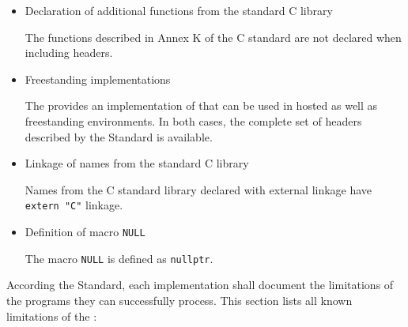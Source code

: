 \begin{itemize}

\item Declaration of additional functions from the standard C library 

The functions described in Annex K of the C standard are not declared when including \cpp{} headers.

\item Freestanding implementations 

The \ecs{} provides an implementation of \cpp{} that can be used in hosted as well as freestanding environments.
In both cases, the complete set of headers described by the \cpp{} Standard is available.

\item Linkage of names from the standard C library 

Names from the C standard library declared with external linkage have \texttt{extern "C"} linkage.

\end{itemize}


\begin{itemize}

\item Definition of macro \texttt{NULL} 

The macro \texttt{NULL} is defined as \texttt{nullptr}.

\end{itemize}


According the \cpp{} Standard, each implementation shall document the limitations of the programs they can successfully process.
This section lists all known limitations of the \ecs{}:

